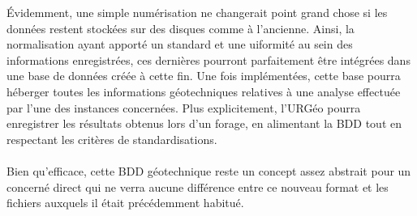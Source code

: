 \par
Évidemment, une simple numérisation ne changerait point grand chose 
si les données restent stockées sur des disques comme à l'ancienne. Ainsi, 
la normalisation ayant apporté un standard et une uiformité au sein des informations 
enregistrées, ces dernières pourront parfaitement être intégrées dans 
une base de données créée à cette fin. Une fois implémentées, cette 
base pourra héberger toutes les informations géotechniques relatives 
à une analyse effectuée par l'une des instances concernées. Plus 
explicitement, l'URGéo pourra enregistrer les résultats obtenus lors 
d'un forage, en alimentant la BDD tout en respectant les critères de 
standardisations.
\paragraph{}
Bien qu'efficace, cette BDD géotechnique reste un concept assez 
abstrait pour un concerné direct qui ne verra aucune différence 
entre ce nouveau format et les fichiers auxquels il était 
précédemment habitué.